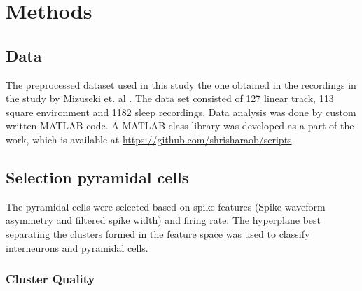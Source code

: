 \chapter{Methods}
\label{analysis}

\section{Data}
The preprocessed dataset used in this study the one obtained in the recordings in the study by Mizuseki et. al \cite{Mizuseki2012}. The data set consisted of 127 linear track, 113 square environment and 1182 sleep recordings. Data analysis was done by custom written MATLAB code. A MATLAB class library was developed as a part of the work, which is available at \url{https://github.com/shrisharaob/scripts}

\section{Selection pyramidal cells}
The pyramidal cells were selected based on spike features (Spike waveform asymmetry and filtered spike width) \cite{Sirota2008} and firing rate. The hyperplane best separating the clusters formed in the feature space was used to classify interneurons and pyramidal cells.

\subsection{Cluster Quality}

